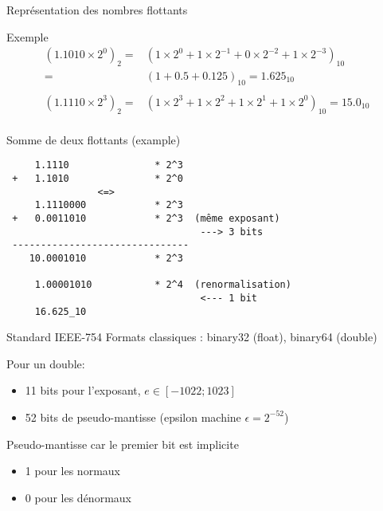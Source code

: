 \documentclass{beamer}
\begin{document}
\begin{frame}{Représentation des nombres flottants}
\begin{center}
    \end{center}
    \begin{block}{Exemple}
        \begin{align*}
            (1.1010 \times 2^0)_2 =   & (1 \times 2^0 + 1 \times 2^{-1} + 0 \times 2^{-2} + 1 \times 2^{-3})_{10}                    \\
            =                         & (1 + 0.5 + 0.125)_{10} = 1.625_{10}                                                          \\                                                \\
            (1.1110 \times 2^{3})_2 = & (1 \times 2^{3} + 1 \times 2^{2} + 1 \times 2^{1} + 1 \times 2^0)_{10} = 15.0_{10}           \\
        \end{align*}
    \end{block}
\end{frame}

\begin{frame}[fragile]{Somme de deux flottants (example)}
    \begin{verbatim}
     1.1110               * 2^3
 +   1.1010               * 2^0
                <=>
     1.1110000            * 2^3
 +   0.0011010            * 2^3  (même exposant)
                                  ---> 3 bits
 -------------------------------
    10.0001010            * 2^3

     1.00001010           * 2^4  (renormalisation)
                                  <--- 1 bit
     16.625_10
    \end{verbatim}
\end{frame}

\begin{frame}{Standard IEEE-754}
    Formats classiques : binary32 (float), binary64 (double)

    Pour un double:
    \begin{itemize}
        \item 11 bits pour l'exposant, $e \in [-1022; 1023]$
        \item 52 bits de pseudo-mantisse (epsilon machine $\epsilon = 2^{-52}$)
    \end{itemize}

    Pseudo-mantisse car le premier bit est implicite
    \begin{itemize}
        \item 1 pour les normaux
        \item 0 pour les dénormaux
    \end{itemize}
\end{frame}
\end{document}
